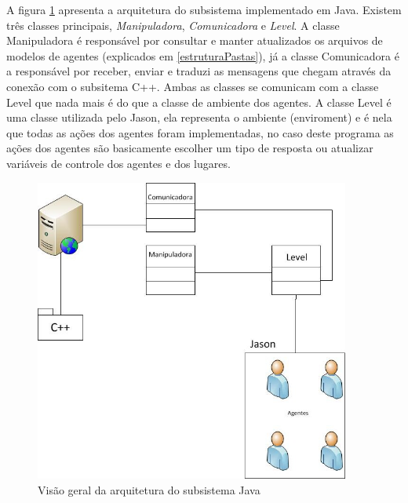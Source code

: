 A figura \ref{arquiteturaJava} apresenta a arquitetura do subsistema implementado em Java. Existem três classes principais, \emph{Manipuladora}, \emph{Comunicadora} e \emph{Level}.
A classe Manipuladora é responsável por consultar e manter atualizados os arquivos de modelos de agentes (explicados em \ref{estruturaPastas}), já a classe Comunicadora é a responsável por receber, enviar e traduzi as mensagens que chegam através da conexão com o subsitema C++. Ambas as classes se comunicam com a classe Level que nada mais é do que a classe de ambiente dos agentes. A classe Level é uma classe utilizada pelo Jason, ela representa o ambiente (enviroment) e é nela que todas as ações dos agentes foram implementadas, no caso deste programa as ações dos agentes são basicamente escolher um tipo de resposta ou atualizar variáveis de controle dos agentes e dos lugares.

\begin{figure}
\centering
\includegraphics[height=10cm]{figuras/arquitetura-java.jpg}
\caption{Visão geral da arquitetura do subsistema Java}
\label{arquiteturaJava}
\end{figure}

